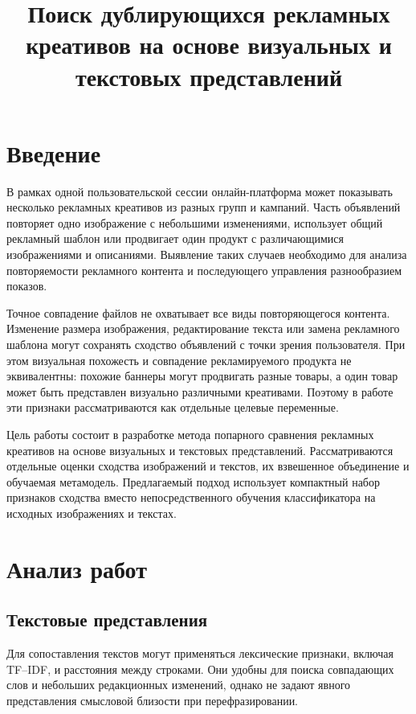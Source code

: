 \documentclass{misisarticle}
\title{Поиск дублирующихся рекламных креативов на основе визуальных и текстовых представлений}
\begin{document}
\maketitle

\section{Введение}

В рамках одной пользовательской сессии онлайн-платформа может показывать несколько рекламных креативов из разных групп и кампаний. Часть объявлений повторяет одно изображение с небольшими изменениями, использует общий рекламный шаблон или продвигает один продукт с различающимися изображениями и описаниями. Выявление таких случаев необходимо для анализа повторяемости рекламного контента и последующего управления разнообразием показов.

Точное совпадение файлов не охватывает все виды повторяющегося контента. Изменение размера изображения, редактирование текста или замена рекламного шаблона могут сохранять сходство объявлений с точки зрения пользователя. При этом визуальная похожесть и совпадение рекламируемого продукта не эквивалентны: похожие баннеры могут продвигать разные товары, а один товар может быть представлен визуально различными креативами. Поэтому в работе эти признаки рассматриваются как отдельные целевые переменные.

Цель работы состоит в разработке метода попарного сравнения рекламных креативов на основе визуальных и текстовых представлений. Рассматриваются отдельные оценки сходства изображений и текстов, их взвешенное объединение и обучаемая метамодель. Предлагаемый подход использует компактный набор признаков сходства вместо непосредственного обучения классификатора на исходных изображениях и текстах.

\section{Анализ работ}

\subsection{Текстовые представления}

Для сопоставления текстов могут применяться лексические признаки, включая TF--IDF, и расстояния между строками. Они удобны для поиска совпадающих слов и небольших редакционных изменений, однако не задают явного представления смысловой близости при перефразировании.
\end{document}
